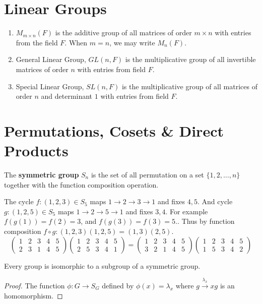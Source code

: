 \section{Linear Groups}
\begin{enumerate}
	\item $M_{m \times n}(F)$ is the additive group of all matrices of order $m \times n$ with entries from the field $F$.
	When $m=n$, we may write $M_n(F)$.
	\item General Linear Group, $GL(n,F)$ is the multiplicative group of all invertible matrices of order $n$ with entries from field $F$.
	\item Special Linear Group, $SL(n,F)$ is the multiplicative group of all matrices of order $n$ and determinant $1$ with entries from field $F$.
\end{enumerate}

\section{Permutations, Cosets \& Direct Products}
\begin{definition}
	The \textbf{symmetric group} $S_n$ is the set of all permutation on a set $\{1,2,\dots,n\}$ together with the function composition operation.
\end{definition}

	The cycle $f: (1,2,3) \in S_5$ maps $1 \to 2 \to 3 \to 1$ and fixes $4,5$. And cycle $g:(1,2,5) \in S_5$ maps $1 \to 2 \to 5 \to 1$ and fixes $3,4$.
	For example $f(g(1)) = f(2) = 3$, and $f(g(3)) = f(3) = 5$..
	Thus by function composition $f \circ g : (1,2,3)(1,2,5) = (1,3)(2,5)$.
	$$ \begin{pmatrix} 1 & 2 & 3 & 4 & 5 \\ 2 & 3 & 1 & 4 & 5 \end{pmatrix} \begin{pmatrix} 1 & 2 & 3 & 4 & 5 \\ 2 & 5 & 3 & 4 & 1 \end{pmatrix} = \begin{pmatrix} 1 & 2 & 3 & 4 & 5 \\ 3 & 2 & 1 & 4 & 5 \end{pmatrix} \begin{pmatrix} 1 & 2 & 3 & 4 & 5 \\ 1 & 5 & 3 & 4 & 2 \end{pmatrix}$$

\begin{theorem}[Cayley]
	Every group is isomorphic to a subgroup of a symmetric group.
\end{theorem}
\begin{proof}
	The function $\phi : G \to S_G$ defined by $\phi(x) = \lambda_x$ where $g \overset{\lambda_x}{\to} xg$ is an homomorphism.
\end{proof}

